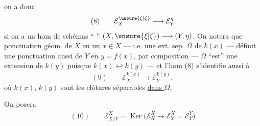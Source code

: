 
on a donc
\[
(8)\qquad \mathcal E_X^{\unsure{\xi|\zeta}}\longrightarrow\mathcal E_Y^\eta
\]
si on a un hom de schémas `` '' $(X,\unsure{\xi|\zeta})\longrightarrow(Y,\eta)$. On notera que  ponctuation géom. de $X$ en un $x\in X$ --- i.e. une ext. sep.  $\Omega$ de $k(x)$ --- définit  une ponctuation  aussi de $Y$ en $y=f(x)$,  par composition --- $\Omega$ ``est'' une extension de $k(y)$ puisque $k(x)\hookleftarrow k(y)$ --- et l'hom (8) s'identifie aussi à
\[
(9)\qquad \mathcal E_X^{\overline{k(x)}}\longrightarrow\mathcal E_Y^{\overline{k(y)}},
\]
où $\overline{k(x)}$, $\overline{k(y)}$ sont les clôtures séparables \uline{dans $\Omega$}.

On posera
\[
(10)\qquad \mathcal E_{X/Y}^{\widetilde X}=\operatorname{Ker}\bigl(\mathcal E_X^{\widetilde X}\longrightarrow\mathcal E_Y^{\widetilde X}=\mathcal E_Y^{\widetilde Y}\bigr)
\]

